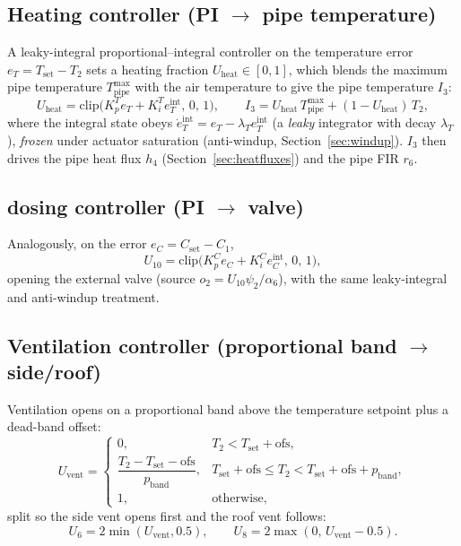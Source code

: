 \documentclass[11pt,a4paper]{article}
\newcommand{\Tair}{T_{2}}
\newcommand{\Cair}{C_{1}}
\begin{document}
\subsection{Heating controller (PI $\to$ pipe temperature)}
A leaky-integral proportional--integral controller on the temperature error
$e_T=T_{\text{set}}-\Tair$ sets a heating fraction $U_{\text{heat}}\in[0,1]$, which blends the
maximum pipe temperature $T_{\text{pipe}}^{\max}$ with the air temperature to give the pipe
temperature $I_3$:
\begin{equation}
  U_{\text{heat}} = \mathrm{clip}\big(K_p^{T} e_T + K_i^{T} e_T^{\text{int}},\,0,\,1\big), \qquad
  I_3 = U_{\text{heat}}\,T_{\text{pipe}}^{\max} + (1-U_{\text{heat}})\,\Tair,
\end{equation}
where the integral state obeys $\dot{e}_T^{\text{int}} = e_T - \lambda_T e_T^{\text{int}}$ (a
\emph{leaky} integrator with decay $\lambda_T$), \emph{frozen} under actuator saturation
(anti-windup, Section~\ref{sec:windup}). $I_3$ then drives the pipe heat flux $h_4$
(Section~\ref{sec:heatfluxes}) and the pipe FIR $r_6$.

\subsection{ dosing controller (PI $\to$ valve)}
Analogously, on the error $e_C=C_{\text{set}}-\Cair$,
\begin{equation}
  U_{10} = \mathrm{clip}\big(K_p^{C} e_C + K_i^{C} e_C^{\text{int}},\,0,\,1\big),
\end{equation}
opening the external  valve (source $o_2=U_{10}\psi_2/\alpha_6$), with the same leaky-integral
and anti-windup treatment.

\subsection{Ventilation controller (proportional band $\to$ side/roof)}
Ventilation opens on a proportional band above the temperature setpoint plus a dead-band offset:
\begin{equation}
  U_{\text{vent}}=\begin{cases}
    0, & \Tair < T_{\text{set}}+\text{ofs},\\[2pt]
    \dfrac{\Tair - T_{\text{set}} - \text{ofs}}{p_{\text{band}}}, & T_{\text{set}}+\text{ofs}\le \Tair < T_{\text{set}}+\text{ofs}+p_{\text{band}},\\[6pt]
    1, & \text{otherwise},
  \end{cases}
\end{equation}
split so the side vent opens first and the roof vent follows:
\begin{equation}
  U_6 = 2\min(U_{\text{vent}},0.5), \qquad U_8 = 2\max(0,\,U_{\text{vent}}-0.5).
\end{equation}
\end{document}
